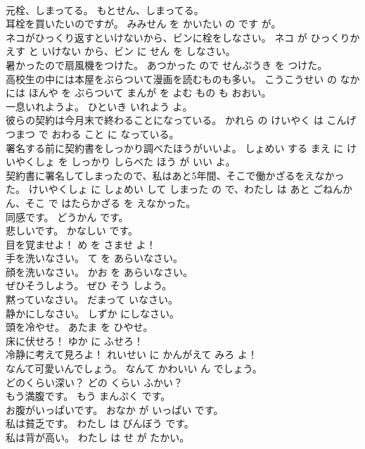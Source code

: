 \documentclass[8pt]{extreport}
\begin{document}
\begin{CJK}{UTF8}{min}
\\	元栓、しまってる。	もとせん、しまってる。	
\\	耳栓を買いたいのですが。	みみせん を かいたい の です が。	
\\	ネコがひっくり返すといけないから、ビンに栓をしなさい。	ネコ が ひっくりかえす と いけない から、ビン に せん を しなさい。	
\\	暑かったので扇風機をつけた。	あつかった ので せんぷうき を つけた。	
\\	高校生の中には本屋をぶらついて漫画を読むものも多い。	こうこうせい の なか には ほんや を ぶらついて まんが を よむ もの も おおい。	
\\	一息いれようよ。	ひといき いれよう よ。	
\\	彼らの契約は今月末で終わることになっている。	かれら の けいやく は こんげつまつ で おわる こと に なっている。	
\\	署名する前に契約書をしっかり調べたほうがいいよ。	しょめい する まえ に けいやくしょ を しっかり しらべた ほう が いい よ。	
\\	契約書に署名してしまったので、私はあと5年間、そこで働かざるをえなかった。	けいやくしょ に しょめい して しまった の で、わたし は あと ごねんかん、そこ で はたらかざる を えなかった。	
\\	同感です。	どうかん です。	
\\	悲しいです。	かなしい です。	
\\	目を覚ませよ！	め を さませ よ！	
\\	手を洗いなさい。	て を あらいなさい。	
\\	顔を洗いなさい。	かお を あらいなさい。	
\\	ぜひそうしよう。	ぜひ そう しよう。	
\\	黙っていなさい。	だまって いなさい。	
\\	静かにしなさい。	しずか にしなさい。	
\\	頭を冷やせ。	あたま を ひやせ。	
\\	床に伏せろ！	ゆか に ふせろ！	
\\	冷静に考えて見ろよ！	れいせい に かんがえて みろ よ！	
\\	なんて可愛いんでしょう。	なんて かわいい ん でしょう。	
\\	どのくらい深い？	どの くらい ふかい？	
\\	もう満腹です。	もう まんぷく です。	
\\	お腹がいっぱいです。	おなか が いっぱい です。	
\\	私は貧乏です。	わたし は びんぼう です。	
\\	私は背が高い。	わたし は せ が たかい。	

\end{CJK}
\end{document}
